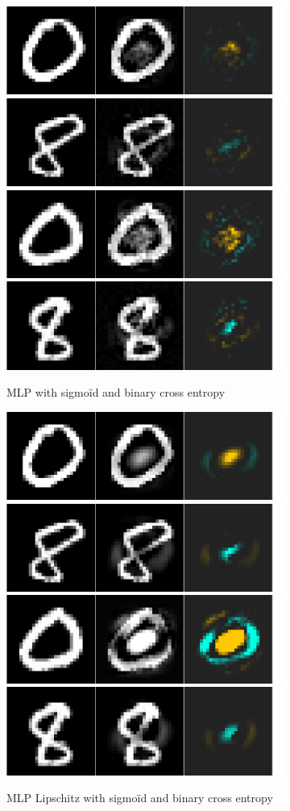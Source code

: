 \documentclass{article}
\begin{document}
\begin{figure}
\centering
\begin{subfigure}{1\textwidth}
  \centering
  \includegraphics[width=0.24\linewidth]{img/fooling/model_MLP128_sigmoid_ReLU_src_and_adv_22.png}
  \includegraphics[width=0.24\linewidth]{img/fooling/model_MLP128_sigmoid_ReLU_src_and_adv_34.png}
  \includegraphics[width=0.24\linewidth]{img/fooling/model_MLP128_sigmoid_ReLU_src_and_adv_42.png}
  \includegraphics[width=0.24\linewidth]{img/fooling/model_MLP128_sigmoid_ReLU_src_and_adv_56.png}
  \caption{MLP with sigmo\"id and binary cross entropy}
\end{subfigure}
\begin{subfigure}{1\textwidth}
  \centering
  \includegraphics[width=0.24\linewidth]{img/fooling/model_MLP_Lip_Sigmoid_src_and_adv_22.png}
  \includegraphics[width=0.24\linewidth]{img/fooling/model_MLP_Lip_Sigmoid_src_and_adv_34.png}
  \includegraphics[width=0.24\linewidth]{img/fooling/model_MLP_Lip_Sigmoid_src_and_adv_42.png}
  \includegraphics[width=0.24\linewidth]{img/fooling/model_MLP_Lip_Sigmoid_src_and_adv_56.png}
  \caption{MLP Lipschitz with sigmo\"id and binary cross entropy}
\end{subfigure}
\begin{subfigure}{1\textwidth}

\end{subfigure}
\end{figure}
\end{document}
